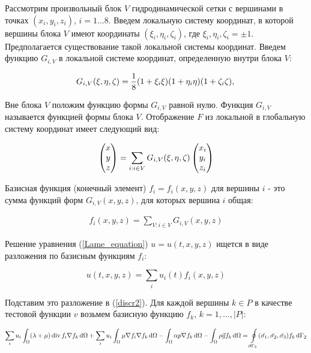 \documentclass[11pt,twoside]{article}
\def\Div{\mathop{\rm div}\nolimits}
\newcommand*\diff{\mathop{}\!\mathrm{d}}
\newcommand*\colvec[3][]{
    \begin{pmatrix}\ifx\relax#1\relax\else#1\\\fi#2\\#3\end{pmatrix}
}
\begin{document}
Рассмотрим произвольный блок $V$ гидродинамической сетки с вершинами в точках $(x_i,y_i,z_i)$, $i=1\dots8$. Введем локальную систему координат, в которой вершины блока $V$ имеют координаты $(\xi_i, \eta_i, \zeta_i)$, где $\xi_i, \eta_i, \zeta_i = \pm 1$. Предполагается существование такой локальной системы координат.
Введем функцию $G_{i,V}$ в локальной системе координат, определенную внутри блока $V$:

\begin{equation}
  \label{shape_func}
  G_{i,V} (\xi, \eta, \zeta) = \dfrac18 (1 + \xi_i \xi) (1 + \eta_i \eta)(1 + \zeta_i \zeta) ,\\
\end{equation}

Вне блока $V$ положим функцию формы $G_{i,V}$ равной нулю. Функция $G_{i,V}$ называется функцией формы блока $V$. Отображение $F$ из локальной в глобальную систему координат имеет следующий вид:

\begin{eqnarray}
  \colvec[x]{y}{z} = \sum\limits_{i: i \in V} G_{i,V} (\xi, \eta, \zeta)\colvec[x_i]{y_i}{z_i}
\end{eqnarray}

Базисная функция (конечный элемент) $f_i=f_i(x,y,z)$ для вершины $i$ - это сумма функций форм $G_{i,V}(x,y,z)$, для которых вершина $i$ общая:

\begin{eqnarray}
\label{basis}
f_i(x,y,z) = \sum\limits_{V: i \in V}G_{i,V}(x,y,z)
\end{eqnarray}

Решение уравнения (\ref{Lame_equation}) $u=u(t,x,y,z)$ ищется в виде разложения по базисным функциям $f_i$:

$$u(t,x,y,z)=\sum\limits_i u_i(t)f_i(x,y,z)$$

Подставим это разложение в (\ref{discr2}). Для каждой вершины $k \in P$ в качестве тестовой функции $v$ возьмем базисную функцию $f_k$, $k=1,\dots,|P|$:

\begin{equation}
\label{discr_final}
\begin{aligned}
 \sum\limits_i u_i \int_{\Omega} (\lambda + \mu) \Div{f_i}\nabla f_k \diff\Omega +
 \sum\limits_i u_i \int_{\Omega} \mu \nabla f_i \nabla f_k \diff\Omega
 - \int_{\Omega} \alpha p \nabla f_k \diff\Omega 
- \int_{\Omega} \rho \vec{g} f_k \diff\Omega = 
\oint \limits_{\partial {\Gamma_2}} (\hat{\sigma_1}, \hat{\sigma_2}, \hat{\sigma_3}) f_k \diff\Gamma_2
\end{aligned}
\end{equation}
\end{document}

